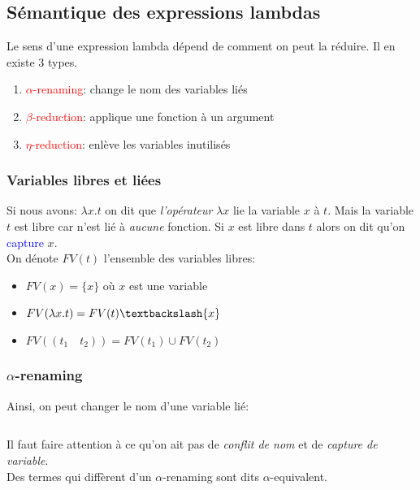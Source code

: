 \documentclass{report}
\begin{document}
\subsection{Sémantique des expressions lambdas}
Le sens d'une expression lambda dépend de comment on peut la réduire. Il en existe 3 types.
\begin{enumerate}
\item \textcolor{red}{$\alpha$-renaming}: change le nom des variables liés
\item \textcolor{red}{$\beta$-reduction}: applique une fonction à un argument
\item \textcolor{red}{$\eta$-reduction}: enlève les variables inutilisés
\end{enumerate}

\subsubsection{Variables libres et liées}	
Si nous avons: $\lambda x.t$ on dit que \textit{l'opérateur} $\lambda x$ lie la variable $x$ à $t$. Mais la variable $t$ est libre car n'est lié à \textit{aucune} fonction. Si $x$ est libre dans $t$ alors on dit qu'on \textcolor{blue}{capture} $x$.\\
On dénote $FV(t)$ l'ensemble des variables libres:
\begin{itemize}
\item $FV(x) = \{x\}$ où $x$ est une variable
\item $FV(\lambda x.t) = FV(t) \textbackslash \{x\}$
\item $FV((t_1 \quad t_2))=FV(t_1) \cup FV(t_2)$
\end{itemize}

\subsubsection{$\alpha$-renaming}
Ainsi, on peut changer le nom d'une variable lié:
\begin{lstlisting}[escapechar=\%]
%$\lambda$%.x x %$\rightarrow_{\alpha}\lambda$%.y y
\end{lstlisting}
Il faut faire attention à ce qu'on ait pas de \textit{conflit de nom} et de \textit{capture de variable}.\\
Des termes qui diffèrent d'un $\alpha$-renaming sont dits $\alpha$-equivalent.
\end{document}
